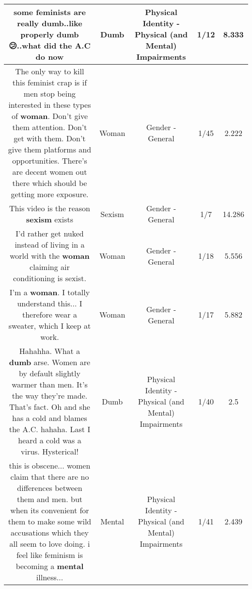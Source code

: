 \documentclass[11pt]{article}
\newlength\mylength
\begin{document}
\begin{center}
\begin{longtable}{|C{.65\mylength}|C{.30\mylength}|C{.12\mylength}|C{.12\mylength}|C{.12\mylength}|}
  \small some feminists are really \textbf{dumb}..like properly \textbf{dumb}😕..what did the A.C do now\normalsize   & Dumb & Physical Identity - Physical (and Mental) Impairments & 1/12 & 8.333 \\  \hline
  \small The only way to kill this feminist crap is if men stop being interested in these types of \textbf{woman}. Don't give them attention. Don't get with them. Don't give them platforms and opportunities. There's are decent women out there which should be getting more exposure.\normalsize   & Woman & Gender - General & 1/45 & 2.222 \\  \hline
  \small This video is the reason \textbf{sexism} exists\normalsize   & Sexism & Gender - General & 1/7 & 14.286 \\  \hline
  \small I'd rather get nuked instead of living in a world with the \textbf{woman} claiming air conditioning is sexist.\normalsize   & Woman & Gender - General & 1/18 & 5.556 \\  \hline
  \small I'm a \textbf{woman}.  I totally understand this... I therefore wear a sweater, which I keep at work.\normalsize   & Woman & Gender - General & 1/17 & 5.882 \\  \hline
  \small Hahahha. What a \textbf{dumb} arse. Women are by default slightly warmer than men. It's the way they're made. That's fact. Oh and she has a cold and blames the A.C.  hahaha. Last I heard a cold was a virus. Hysterical!\normalsize   & Dumb & Physical Identity - Physical (and Mental) Impairments & 1/40 & 2.5 \\  \hline
  \small this is obscene... women claim that there are no differences between them and men. but when its convenient for them to make some wild accusations which they all seem to love doing. i feel like feminism is becoming a \textbf{mental} illness...\normalsize   & Mental & Physical Identity - Physical (and Mental) Impairments & 1/41 & 2.439 \\  \hline

\end{longtable}
\end{center}
\end{document}
